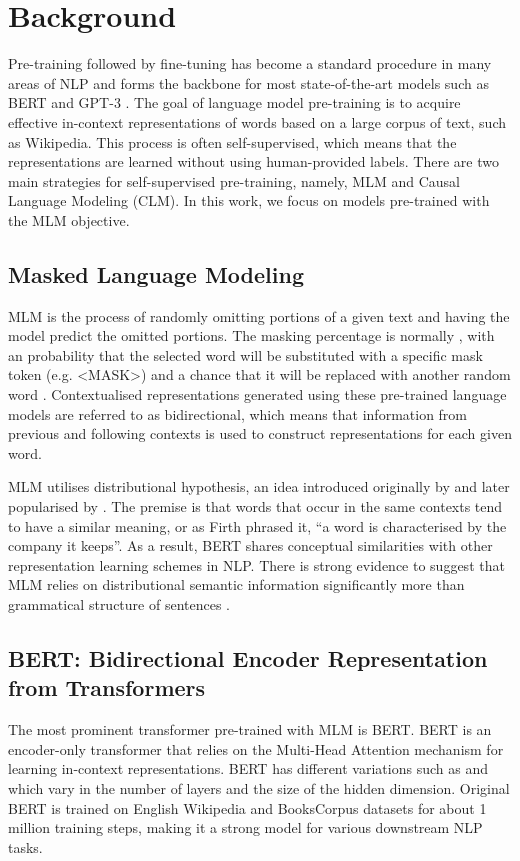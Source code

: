 \documentclass{article}
\begin{document}
\section{Background}

Pre-training followed by fine-tuning has become a standard procedure in many areas of NLP and forms the backbone for most state-of-the-art models such as BERT \citep{devlin-etal-2019-bert} and GPT-3 \citep{brown2020language}. The goal of language model pre-training is to acquire effective in-context representations of words based on a large corpus of text, such as Wikipedia. This process is often self-supervised, which means that the representations are learned without using human-provided labels. There are two main strategies for self-supervised pre-training, namely, MLM and Causal Language Modeling (CLM). In this work, we focus on models pre-trained with the MLM objective. 

\subsection{Masked Language Modeling}
MLM is the process of randomly omitting portions of a given text and having the model predict the omitted portions. The masking percentage is normally , with an  probability that the selected word will be substituted with a specific mask token (e.g. <MASK>) and a  chance that it will be replaced with another random word \citep{devlin-etal-2019-bert}. Contextualised representations generated using these pre-trained language models are referred to as bidirectional, which means that information from previous and following contexts is used to construct representations for each given word.

MLM utilises distributional hypothesis, an idea introduced originally by \citet{harris1954distributional} and later popularised by \citet{firth1957synopsis}. The premise is that words that occur in the same contexts tend to have a similar meaning, or as Firth phrased it, ``a word is characterised by the company it keeps''.  As a result, BERT shares conceptual similarities with other representation learning schemes in NLP. There is strong evidence to suggest that MLM relies on distributional semantic information significantly more than grammatical structure of sentences \citep{sinha-etal-2021-masked}.   

\subsection{BERT: Bidirectional Encoder Representation from Transformers}
The most prominent transformer pre-trained with MLM is BERT. BERT is an encoder-only transformer that relies on the Multi-Head Attention mechanism for learning in-context representations. BERT has different variations such as  and  which vary in the number of layers and the size of the hidden dimension. Original BERT is trained on English Wikipedia and BooksCorpus datasets for about 1 million training steps, making it a strong model for various downstream NLP tasks. 
\end{document}
